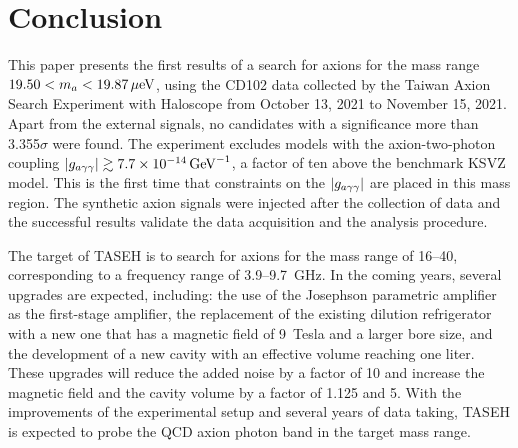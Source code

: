 \section{Conclusion} \label{sec:conclusion}
This paper presents the first results of a search for axions for the mass 
range $19.50 < m_a < 19.87 \,\mu\text{e\hspace{-.08em}V}$, using the CD102 data collected by the 
Taiwan Axion Search Experiment with Haloscope from October 13, 2021 
to November 15, 2021. 
Apart from the external signals, no candidates with a significance more than
3.355$\sigma$ were found. The experiment excludes models with the 
axion-two-photon coupling $\left|g_{a\gamma\gamma}\right|\gtrsim 7.7\times 10^{-14}\,\text{Ge\hspace{-.08em}V}^{-1}$, a factor of ten 
above the benchmark KSVZ model. This is the first time that 
constraints on the $\left|g_{a\gamma\gamma}\right|$ are placed in this mass region. The synthetic 
axion signals were injected after the collection of data and the 
successful results validate the data acquisition and the analysis procedure. 

The target of TASEH is to search for axions for the mass range of 
16--40\muevcc, corresponding to a frequency range of 3.9--9.7~GHz. 
In the coming years, several upgrades are expected, including: the use of 
the Josephson parametric amplifier as the first-stage amplifier, the 
replacement of the existing dilution refrigerator with a new one that has 
a magnetic field of 9~Tesla and a larger bore size, and the development of 
a new cavity with an effective volume reaching one liter. These upgrades 
will reduce the added noise by a factor of 10 and increase the magnetic 
field and the cavity volume by a factor of 1.125 and 5. With the 
improvements of the experimental setup and several years of data taking, 
TASEH is expected to probe the QCD axion photon band in the target mass range.


